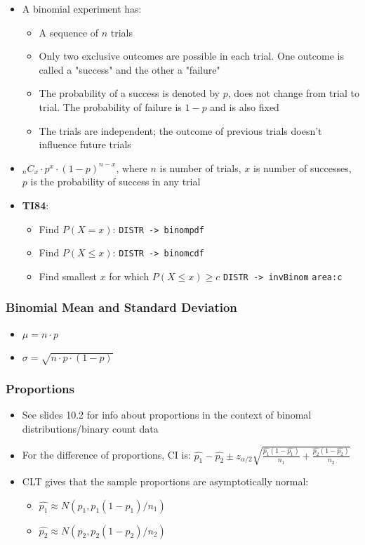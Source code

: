 \documentclass{article}
\newcommand{\code}[1]{\colorbox{light-gray}{\texttt{#1}}}
\begin{document}
\begin{itemize}
    \item A binomial experiment has:
    \begin{itemize}
        \item A sequence of $n$ trials
        \item Only two exclusive outcomes are possible in each trial. One outcome is called a "success" and the other a "failure"
        \item The probability of a success is denoted by $p$, does not change from trial to trial. The probability of failure is $1-p$ and is also fixed
        \item The trials are independent; the outcome of previous trials doesn't influence future trials
    \end{itemize}
    \item $_nC_x \cdot p^x \cdot (1-p)^{n-x}$, where $n$ is number of trials, $x$ is number of successes, $p$ is the probability of success in any trial
    \item \textbf{TI84}:
    \begin{itemize}
        \item Find $P(X=x)$: \code{DISTR -> binompdf}
        \item Find $P(X \leq x)$: \code{DISTR -> binomcdf}
        \item Find smallest $x$ for which $P(X \leq x) \geq c$ \code{DISTR -> invBinom} \code{area:c}
    \end{itemize}
\end{itemize}

\subsubsection{Binomial Mean and Standard Deviation}

\begin{itemize}
    \item $\mu=n \cdot p$
    \item $\sigma = \sqrt{n \cdot p \cdot (1-p)}$
\end{itemize}

\subsubsection{Proportions}

\begin{itemize}
    \item See slides 10.2 for info about proportions in the context of binomal distributions/binary count data
    \item For the difference of proportions, CI is: $\hat{p_1}-\hat{p_2} \pm z_{\alpha/2} \sqrt{\frac{\hat{p_1}(1-\hat{p_1})}{n_1}+\frac{\hat{p_2}(1-\hat{p_2})}{n_2}}$
    \item CLT gives that the sample proportions are asymptotically normal:
    \begin{itemize}
        \item $\hat{p_1} \approx N(p_1,p_1(1-p_1)/n_1)$
        \item $\hat{p_2} \approx N(p_2,p_2(1-p_2)/n_2)$
    \end{itemize}
\end{itemize}
\end{document}
